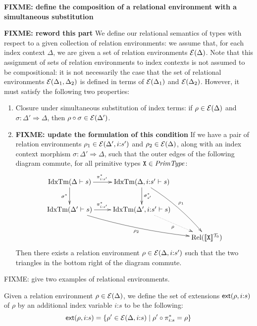 \textbf{FIXME: define the composition of a relational environment with
  a simultaneous substitution}

\textbf{FIXME: reword this part} We define our relational semantics of
types with respect to a given collection of relation environments: we
assume that, for each index context $\Delta$, we are given a set of
relation environments $\mathcal{E}(\Delta)$. Note that this assignment
of sets of relation environments to index contexts is not assumed to
be compositional: it is not necessarily the case that the set of
relational environments $\mathcal{E}(\Delta_1,\Delta_2)$ is defined in
terms of $\mathcal{E}(\Delta_1)$ and $\mathcal{E}(\Delta_2)$. However,
it must satisfy the following two properties:
\begin{enumerate}
\item Closure under simultaneous substitution of index terms: if $\rho
  \in \mathcal{E}(\Delta)$ and $\sigma : \Delta' \Rightarrow \Delta$,
  then $\rho \circ \sigma \in \mathcal{E}(\Delta')$.
\item \textbf{FIXME: update the formulation of this condition} If we
  have a pair of relation environments $\rho_1 \in \mathcal{E}(\Delta',
  i\mathord:s')$ and $\rho_2 \in \mathcal{E}(\Delta)$, along with an
  index context morphism $\sigma : \Delta' \Rightarrow \Delta$, such
  that the outer edges of the following diagram commute, for all
  primitive types $\texttt{X} \in \mathit{PrimType}$:
  \begin{displaymath}
    \xymatrix{
      {\idxTms{\Delta}{s}} \ar[r]^(.45){\pi^*_{i\mathord:s'}} \ar[d]_{\sigma^*}
      &
      {\idxTms{\Delta,i\mathord:s'}{s}} \ar[d]^{\sigma_{s'}^*} \ar@/^/[rdd]^{\rho_1}
      \\
      {\idxTms{\Delta'}{s}} \ar[r]^(.45){\pi^*_{i\mathord:s'}} \ar@/_/[rrd]_{\rho_2}
      &
      {\idxTms{\Delta',i\mathord:s'}{s}} \ar@{.>}[dr]_\rho
      \\
      &
      &
      {\Rel(\tyPrimSem{\tyPrimNm{X}})}
    }
  \end{displaymath}
  Then there exists a relation environment $\rho \in
  \mathcal{E}(\Delta,i\mathord:s')$ such that the two triangles in the
  bottom right of the diagram commute.
\end{enumerate}

\begin{example}
  FIXME: give two examples of relational environments.
\end{example}

Given a relation environment $\rho \in \mathcal{E}(\Delta)$, we define
the set of extensions $\mathsf{ext}(\rho,i\mathord:s)$ of $\rho$ by an
additional index variable $i\mathord:s$ to be the following:
\begin{displaymath}
  \mathsf{ext}(\rho,i\mathord:s) = \{ \rho' \in \mathcal{E}(\Delta,i\mathord:s) \mathrel| \rho' \circ \pi^*_{i\mathord:s} = \rho \}
\end{displaymath}

